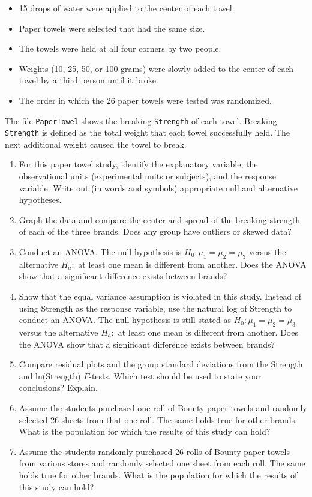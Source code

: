 \documentclass[
]{report}
\begin{document}
\begin{list}{E..}{ \setlength{\itemsep}{1.2em}}
\begin{itemize}
  \item 15 drops of water were applied to the center of each towel.
  \item Paper towels were selected that had the same size.
  \item The towels were held at all four corners by two people.
  \item Weights (10, 25, 50, or 100 grams) were slowly added to the center of each towel by a third person until it broke.
  \item The order in which the 26 paper towels were tested was randomized.
\end{itemize}

The file \texttt{PaperTowel} shows the breaking \texttt{Strength} of each towel. Breaking \texttt{Strength} is defined as the total weight that each towel successfully held. The next additional weight caused the towel to break.

    \begin{enumerate}
      \item For this paper towel study, identify the explanatory variable, the observational units (experimental units or subjects), and the response variable. Write out (in words and symbols) appropriate null and alternative hypotheses.
      \item Graph the data and compare the center and spread of the breaking strength of each of the three brands. Does any group have outliers or skewed data?
      \item Conduct an ANOVA. The null hypothesis is $H_0\colon \mu_1 = \mu_2 = \mu_3$ versus the alternative $H_a\colon$ at least one mean is different from another. Does the ANOVA show that a significant difference exists between brands?
      \item Show that the equal variance assumption is violated in this study. Instead of using Strength as the response variable, use the natural log of Strength to conduct an ANOVA. The null hypothesis is still stated as $H_0\colon \mu_1 = \mu_2 = \mu_3$ versus the alternative $H_a\colon$ at least one mean is different from another. Does the ANOVA show that a significant difference exists between brands?
      \item Compare residual plots and the group standard deviations from the Strength and ln(Strength) $F$-tests. Which test should be used to state your conclusions? Explain.
      \item Assume the students purchased one roll of Bounty paper towels and randomly selected 26 sheets from that one roll. The same holds true for other brands. What is the population for which the results of this study can hold?
      \item Assume the students randomly purchased 26 rolls of Bounty paper towels from various stores and randomly selected one sheet from each roll. The same holds true for other brands. What is the population for which the results of this study can hold?
    \end{enumerate}


\end{list}
\end{document}
